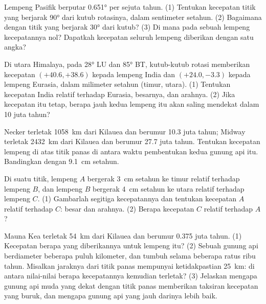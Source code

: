 \begin{exercise}[$\star\star$]\label{exo:g11:plate-motions:8}
Lempeng Pasifik berputar \ang{0.651} per sejuta tahun. (1) Tentukan kecepatan
titik yang berjarak \ang{90} dari kutub rotasinya, dalam sentimeter setahun.
(2) Bagaimana dengan titik yang berjarak \ang{30} dari kutub? (3) Di mana pada
sebuah lempeng kecepatannya nol? Dapatkah kecepatan seluruh lempeng diberikan
dengan satu angka?
\end{exercise}

\begin{exercise}[$\star\star$]\label{exo:g11:plate-motions:9}
Di utara Himalaya, pada \ang{28} LU dan \ang{85} BT, kutub-kutub rotasi
memberikan kecepatan $(+40.6, +38.6)$ kepada lempeng India dan
$(+24.0, -3.3)$ kepada lempeng Eurasia, dalam milimeter setahun (timur, utara).
(1) Tentukan kecepatan India relatif terhadap Eurasia, besarnya, dan arahnya.
(2) Jika kecepatan itu tetap, berapa jauh kedua lempeng itu akan saling
mendekat dalam 10 juta tahun?
\end{exercise}

\begin{exercise}[$\star\star$]\label{exo:g11:plate-motions:10}
Necker terletak \qty{1058}{km} dari Kilauea dan berumur \num{10.3} juta tahun;
Midway terletak \qty{2432}{km} dari Kilauea dan berumur \num{27.7} juta tahun.
Tentukan kecepatan lempeng di atas titik panas di antara waktu pembentukan kedua
gunung api itu. Bandingkan dengan \qty{9.1}{cm} setahun.
\end{exercise}

\begin{exercise}[$\star\star$]\label{exo:g11:plate-motions:11}
Di suatu titik, lempeng $A$ bergerak \qty{3}{cm} setahun ke timur relatif
terhadap lempeng $B$, dan lempeng $B$ bergerak \qty{4}{cm} setahun ke utara
relatif terhadap lempeng $C$.
(1) Gambarlah segitiga kecepatannya dan tentukan kecepatan $A$ relatif terhadap
$C$: besar dan arahnya. (2) Berapa kecepatan $C$ relatif terhadap $A$?
\end{exercise}

\begin{exercise}[$\star\star\star$]\label{exo:g11:plate-motions:12}
Mauna Kea terletak \qty{54}{km} dari Kilauea dan berumur \num{0.375} juta
tahun. (1) Kecepatan berapa yang diberikannya untuk lempeng itu? (2) Sebuah
gunung api berdiameter beberapa puluh kilometer, dan tumbuh selama beberapa
ratus ribu tahun. Misalkan jaraknya dari titik panas mempunyai ketidakpastian
\qty{25}{km}: di antara nilai-nilai berapa kecepatannya kemudian terletak?
(3) Jelaskan mengapa gunung api muda yang dekat dengan titik panas memberikan
taksiran kecepatan yang buruk, dan mengapa gunung api yang jauh darinya lebih
baik.
\end{exercise}

